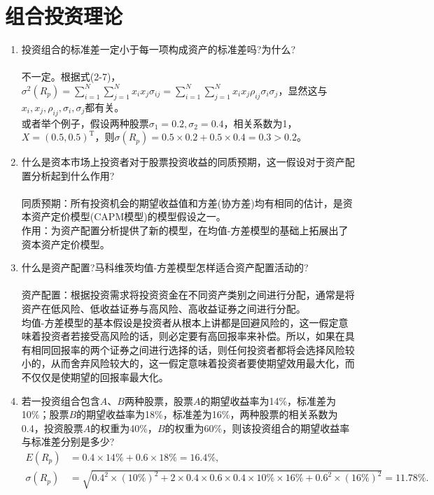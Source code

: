 \section{组合投资理论}
\begin{enumerate}
    \item 投资组合的标准差一定小于每一项构成资产的标准差吗?为什么?\\
    \sol\\
    不一定。根据式(2-7)，$\displaystyle \sigma^2(R_p)=\sum\limits_{i=1}^N \sum\limits_{j=1}^N x_ix_j\sigma_{ij}=\sum\limits_{i=1}^N \sum\limits_{j=1}^N x_ix_j \rho_{ij} \sigma_i \sigma_j$，显然这与$x_i,x_j,\rho_{ij},\sigma_i,\sigma_j$都有关。\\
    或者举个例子，假设两种股票$\sigma_1=0.2,\sigma_2=0.4$，相关系数为1，$X=(0.5,0.5)^{\mathrm{T}}$，则$\sigma(R_p)=0.5 \times 0.2 + 0.5 \times 0.4=0.3 > 0.2$。
    \item 什么是资本市场上投资者对于股票投资收益的同质预期，这一假设对于资产配置分析起到什么作用?\\
    \sol\\
    同质预期：所有投资机会的期望收益值和方差(协方差)均有相同的估计，是资本资产定价模型(CAPM模型)的模型假设之一。\\
    作用：为资产配置分析提供了新的模型，在均值-方差模型的基础上拓展出了资本资产定价模型。
    \item 什么是资产配置?马科维茨均值-方差模型怎样适合资产配置活动的?\\
    \sol\\
    资产配置：根据投资需求将投资资金在不同资产类别之间进行分配，通常是将资产在低风险、低收益证券与高风险、高收益证券之间进行分配。\\
    均值-方差模型的基本假设是投资者从根本上讲都是回避风险的，这一假定意味着投资者若接受高风险的话，则必定要有高回报率来补偿。所以，如果在具有相同回报率的两个证券之间进行选择的话，则任何投资者都将会选择风险较小的，从而舍弃风险较大的，这一假定意味着投资者要使期望效用最大化，而不仅仅是使期望的回报率最大化。
    \item 若一投资组合包含$A$、$B$两种股票，股票$A$的期望收益率为14\%，标准差为10\%；股票$B$的期望收益率为18\%，标准差为16\%，两种股票的相关系数为0.4，投资股票$A$的权重为40\%，$B$的权重为60\%，则该投资组合的期望收益率与标准差分别是多少?\\
    \sol
    \begin{align*}
        E(R_p) & = 0.4 \times 14\% + 0.6 \times 18\% = 16.4\%,\\
        \sigma(R_p) & = \sqrt{0.4^2 \times (10\%)^2 + 2\times 0.4 \times 0.6 \times 0.4 \times 10\% \times 16\% + 0.6^2 \times (16\%)^2} = 11.78 \%.

\end{align*}
\end{enumerate}
